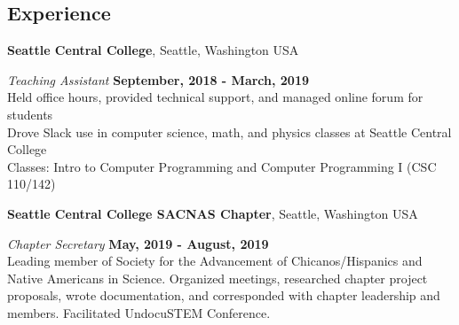 \documentclass[margin,line]{res}
\newenvironment{list2}{
  \begin{list}{$\bullet$}{%
      \setlength{\itemsep}{0in}
      \setlength{\parsep}{0in} \setlength{\parskip}{0in}
      \setlength{\topsep}{0in} \setlength{\partopsep}{0in} 
      \setlength{\leftmargin}{0.2in}}}{\end{list}}
\begin{document}
\begin{resume}
\vspace{-.3cm}
\section{\sc Experience}


{\bf Seattle Central College}, Seattle, Washington USA

\vspace{-.3cm}
{\em Teaching Assistant} \hfill {\bf September, 2018  - March, 2019}\\
Held office hours, provided technical support, and managed online forum for students \\
Drove Slack use in computer science, math, and physics classes at Seattle Central College \\
Classes: Intro to Computer Programming and Computer Programming I (CSC 110/142)






{\bf Seattle Central College SACNAS Chapter}, Seattle, Washington USA

\vspace{-.3cm}
{\em Chapter Secretary} \hfill {\bf May, 2019 - August, 2019}\\
Leading member of Society for the Advancement of Chicanos/Hispanics and Native Americans in Science.
  Organized meetings, researched chapter project proposals, wrote documentation, and 
  corresponded with chapter leadership and members. Facilitated UndocuSTEM Conference.

\end{resume}
\end{document}

